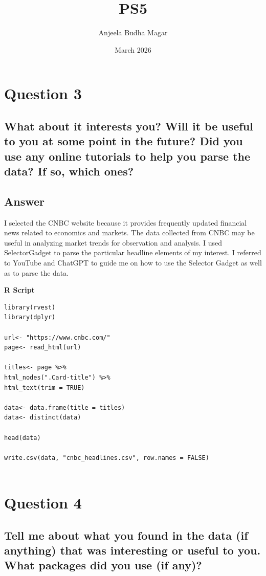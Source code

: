 \documentclass{article}
\title{PS5}
\author{Anjeela Budha Magar}
\date{March 2026}
\begin{document}
\maketitle

\section{Question 3}
\subsection*{What about it interests you? Will it be useful to you at some point in the future? Did you use any online tutorials to help you parse the data? If so, which ones?}

\subsection*{Answer} I selected the CNBC website because it provides frequently updated financial news related to economics and markets. The data collected from CNBC may be useful in analyzing market trends for observation and analysis. I used SelectorGadget to parse the particular headline elements of my interest. I referred to YouTube and ChatGPT to guide me on how to use the Selector Gadget as well as to parse the data. 

\vspace{0.5cm}
\textbf{R Script}
\begin{verbatim}
library(rvest)
library(dplyr)

url<- "https://www.cnbc.com/"
page<- read_html(url)

titles<- page %>%
html_nodes(".Card-title") %>%
html_text(trim = TRUE)

data<- data.frame(title = titles)
data<- distinct(data)

head(data)

write.csv(data, "cnbc_headlines.csv", row.names = FALSE)


\end{verbatim}

\section{Question 4}
\subsection*{Tell me about what you found in the data (if anything) that was interesting or useful to you. What packages did you use (if any)?}
\end{document}
